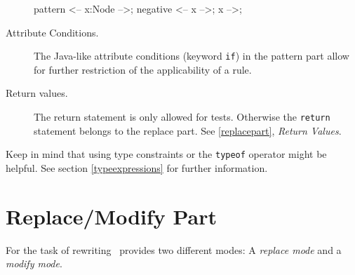 \begin{description}
\begin{example}
    \begin{grgen}
pattern {
  <-- x:Node -->;
  negative {
    <-- x -->;
    x -->;
  }
}
    \end{grgen}
  \end{example}
  \item[Attribute Conditions.] The Java-like attribute conditions (keyword \texttt{if}) in the pattern part allow for further restriction of the applicability of a rule.
  \item[Return values.] The return statement is only allowed for tests. Otherwise the \texttt{return} statement belongs to the replace part. See \ref{replacepart}, \emph{Return Values}.
\end{description}
Keep in mind that using type constraints or the \texttt{typeof} operator might be helpful. See section \ref{typeexpressions} for further information.

\section{Replace/Modify Part}
\label{replacepart}
For the task of rewriting \GrG\ provides two different modes: A \emph{replace mode} and a \emph{modify mode}.


